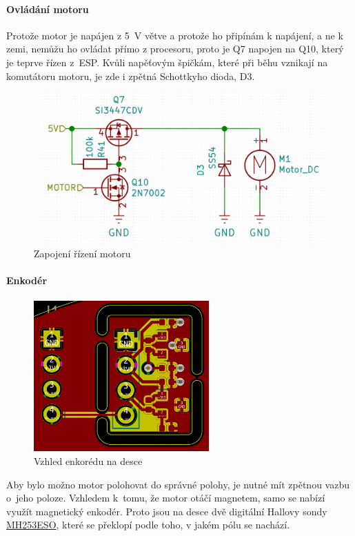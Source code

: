 \newpage

\paragraph{Ovládání motoru}
Protože motor je napájen z 5~V větve a protože ho připínám k napájení, a ne k zemi, nemůžu ho ovládat přímo z procesoru, proto je Q7 napojen na Q10, který je teprve řízen z~ESP. 
Kvůli napěťovým špičkám, které při běhu vznikají na komutátoru motoru, je zde i zpětná Schottkyho dioda, D3.%

\begin{figure}[htbp]
    \centering
    \includegraphics[width=\textwidth]{kapitoly/obrazky/E4/ir_motor_enkoder/ovladani_motoru.png}
    \caption{Zapojení řízení motoru}
    \label{fig:E4-motor}
\end{figure}

\newpage

\paragraph{Enkodér}

\begin{figure}
    \centering
    \includegraphics[width= 0.6\textwidth]{kapitoly/obrazky/E4/ir_motor_enkoder/pcb-enc.png}
    \caption{\label{fig:E4-enkoder_pcb}Vzhled enkorédu na desce}
\end{figure}
Aby bylo možno motor polohovat do správné polohy, je nutné mít zpětnou vazbu o~jeho poloze. Vzhledem k~tomu, že motor otáčí magnetem, samo se nabízí využít magnetický enkodér. 
Proto jsou na desce dvě digitální Hallovy sondy \href{https://datasheet.lcsc.com/szlcsc/Magnesensor-Tech-MST-MH253ESO_C114369.pdf}{MH253ESO}, které se překlopí podle toho, v jakém pólu 
se nachází. 

